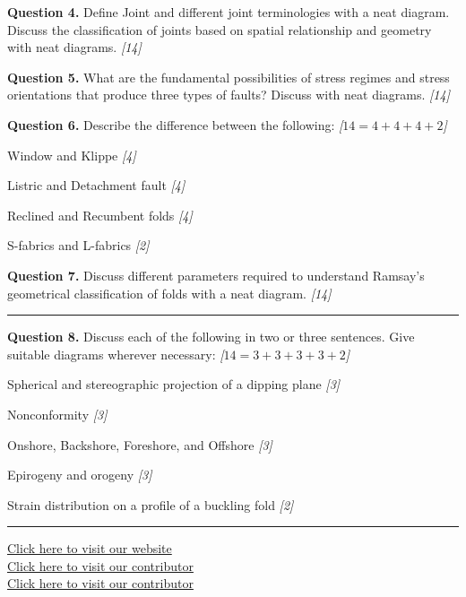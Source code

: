 \documentclass[11pt,a4paper]{article}
\newcommand{\pts}[1]{\hfill   \textit{[#1]}}
\begin{document}
\noindent   \textbf{Question 4.} Define Joint and different joint terminologies with a neat diagram. Discuss the classification of joints based on spatial relationship and geometry with neat diagrams. \pts{14}

\medskip


\noindent   \textbf{Question 5.} What are the fundamental possibilities of stress regimes and stress orientations that produce three types of faults? Discuss with neat diagrams. \pts{14}

\medskip


\noindent   \textbf{Question 6.} Describe the difference between the following: \pts{$14 = 4+4+4+2$}

\begin{parts}
  \item Window and Klippe \pts{4}
  \item Listric and Detachment fault \pts{4}
  \item Reclined and Recumbent folds \pts{4}
  \item S-fabrics and L-fabrics \pts{2}
\end{parts}

\medskip


\noindent   \textbf{Question 7.} Discuss different parameters required to understand Ramsay's geometrical classification of folds with a neat diagram. \pts{14}

\bigskip


\rule{\linewidth}{0.4pt}\smallskip




\noindent   \textbf{Question 8.} Discuss each of the following in two or three sentences. Give suitable diagrams wherever necessary: \pts{$14 = 3+3+3+3+2$}

\begin{parts}
  \item Spherical and stereographic projection of a dipping plane \pts{3}
  \item Nonconformity \pts{3}
  \item Onshore, Backshore, Foreshore, and Offshore \pts{3}
  \item Epirogeny and orogeny \pts{3}
  \item Strain distribution on a profile of a buckling fold \pts{2}
\end{parts}

\vfill\rule{\linewidth}{0.4pt}

\begin{center}\small
\href{https://bhu-exam.vercel.app/}{Click here to visit our website}\\[4pt]
\href{https://me-aryan.vercel.app/}{Click here to visit our contributor}\\[4pt]
\href{https://quashan-me.vercel.app/}{Click here to visit our contributor}
\end{center}
\end{document}
